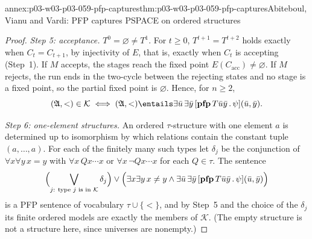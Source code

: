 \begin{annexitem}{annex:p03-w03-p03-059-pfp-captures}{thm:p03-w03-p03-059-pfp-captures}{Abiteboul, Vianu and Vardi: PFP captures PSPACE on ordered structures}
\begin{proof}
\emph{Step 5: acceptance.} \(T^0=\varnothing\neq T^1\). For \(t\geq0\),
\(T^{t+1}=T^{t+2}\) holds exactly when \(C_t=C_{t+1}\), by injectivity of
\(E\), that is, exactly when \(C_t\) is accepting (Step~1). If \(M\)
accepts, the stages reach the fixed point \(E(C_{\mathrm{acc}})\neq
\varnothing\). If \(M\) rejects, the run ends in the two-cycle between the
rejecting states and no stage is a fixed point, so the partial fixed point
is \(\varnothing\). Hence, for \(n\geq2\),
\[
 (\mathfrak A,<)\in\mathcal K\iff
 (\mathfrak A,<)\entails\exists\bar u\,\exists\bar y\,
 [\mathbf{pfp}\,T\bar u\bar y\,.\,\psi](\bar u,\bar y).
\]

\emph{Step 6: one-element structures.} An ordered \(\tau\)-structure with one
element \(a\) is determined up to isomorphism by which relations contain the
constant tuple \((a,\ldots,a)\). For each of the finitely many such types
let \(\delta_j\) be the conjunction of \(\forall x\forall y\,x=y\) with
\(\forall x\,Qx\cdots x\) or \(\forall x\,\neg Qx\cdots x\) for each
\(Q\in\tau\). The sentence
\[
 \Bigl(\bigvee_{j:\ \text{type \(j\) is in \(\mathcal K\)}}\delta_j\Bigr)\lor
 \Bigl(\exists x\exists y\,x\neq y\land\exists\bar u\,\exists\bar y\,
 [\mathbf{pfp}\,T\bar u\bar y\,.\,\psi](\bar u,\bar y)\Bigr)
\]
is a PFP sentence of vocabulary \(\tau\cup\{<\}\), and by Step~5 and the
choice of the \(\delta_j\) its finite ordered models are exactly the members
of \(\mathcal K\). (The empty structure is not a structure here, since
universes are nonempty.)
\end{proof}
\end{annexitem}

